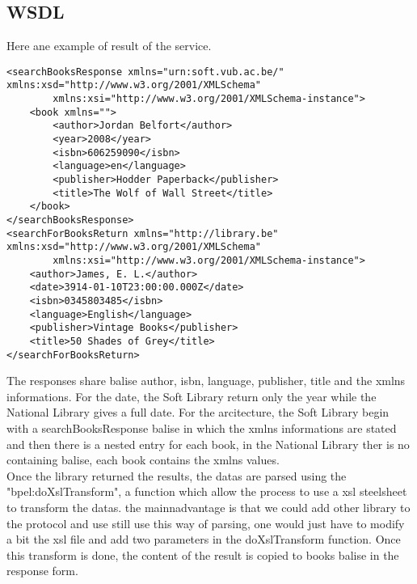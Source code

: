 \documentclass[a4paper,10pt]{article}
\begin{document}
\subsection{WSDL}
Here ane example of result of the service.
\begin{verbatim}
<searchBooksResponse xmlns="urn:soft.vub.ac.be/" xmlns:xsd="http://www.w3.org/2001/XMLSchema"
        xmlns:xsi="http://www.w3.org/2001/XMLSchema-instance">
    <book xmlns="">
        <author>Jordan Belfort</author>
        <year>2008</year>
        <isbn>606259090</isbn>
        <language>en</language>
        <publisher>Hodder Paperback</publisher>
        <title>The Wolf of Wall Street</title>
    </book>
</searchBooksResponse>
<searchForBooksReturn xmlns="http://library.be" xmlns:xsd="http://www.w3.org/2001/XMLSchema" 
        xmlns:xsi="http://www.w3.org/2001/XMLSchema-instance">
    <author>James, E. L.</author>
    <date>3914-01-10T23:00:00.000Z</date>
    <isbn>0345803485</isbn>
    <language>English</language>
    <publisher>Vintage Books</publisher>
    <title>50 Shades of Grey</title>
</searchForBooksReturn>
\end{verbatim}
The responses share balise author, isbn, language, publisher, title and the xmlns informations. For the date, the Soft Library return only the year while the National Library gives a full date. For the arcitecture, the Soft Library begin with a searchBooksResponse balise in which the xmlns informations are stated and then there is a nested entry for each book, in the National Library ther is no containing balise, each book contains the xmlns values.\\

Once the library returned the results, the datas are parsed using the "bpel:doXslTransform", a function which allow the process to use a xsl steelsheet to transform the datas. the mainnadvantage is that we could add other library to the protocol and use still use this way of parsing, one would just have to modify a bit the xsl file and add two parameters in the doXslTransform function. Once this transform is done, the content of the result is copied to books balise in the response form.
\end{document}
